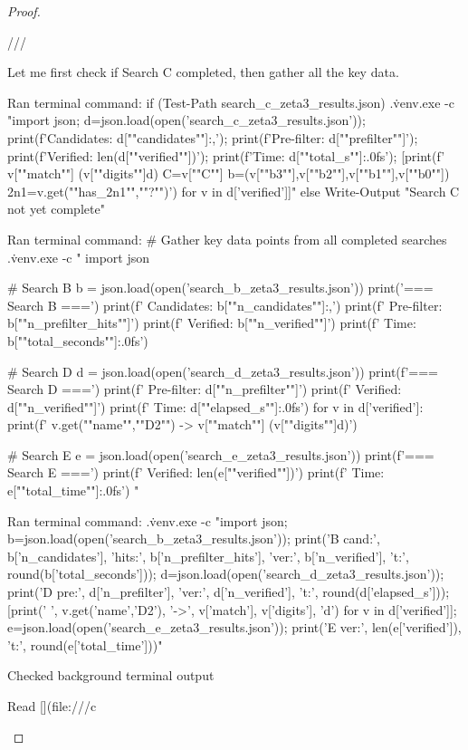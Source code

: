 \begin{theorem}
\begin{lemma}
\begin{proposition}
\begin{corollary}
\begin{proof}
\begin{remark}
///

Let me first check if Search C completed, then gather all the key data. 

Ran terminal command: if (Test-Path search_c_zeta3_results.json) { .\.venv\Scripts\python.exe -c "import json; d=json.load(open('search_c_zeta3_results.json')); print(f'Candidates: {d[""candidates""]:,}'); print(f'Pre-filter: {d[""prefilter""]}'); print(f'Verified: {len(d[""verified""])}'); print(f'Time: {d[""total_s""]:.0f}s'); [print(f'  {v[""match""]} ({v[""digits""]}d) C={v[""C""]} b=({v[""b3""]},{v[""b2""]},{v[""b1""]},{v[""b0""]}) 2n1={v.get(""has_2n1"",""?"")}') for v in d['verified']]" } else { Write-Output "Search C not yet complete" }

Ran terminal command: # Gather key data points from all completed searches
.\.venv\Scripts\python.exe -c "
import json

# Search B
b = json.load(open('search_b_zeta3_results.json'))
print('=== Search B ===')
print(f'  Candidates: {b[""n_candidates""]:,}')
print(f'  Pre-filter: {b[""n_prefilter_hits""]}')
print(f'  Verified: {b[""n_verified""]}')
print(f'  Time: {b[""total_seconds""]:.0f}s')

# Search D
d = json.load(open('search_d_zeta3_results.json'))
print(f'=== Search D ===')
print(f'  Pre-filter: {d[""n_prefilter""]}')
print(f'  Verified: {d[""n_verified""]}')
print(f'  Time: {d[""elapsed_s""]:.0f}s')
for v in d['verified']:
    print(f'    {v.get(""name"",""D2"")} -> {v[""match""]} ({v[""digits""]}d)')

# Search E
e = json.load(open('search_e_zeta3_results.json'))
print(f'=== Search E ===')
print(f'  Verified: {len(e[""verified""])}')
print(f'  Time: {e[""total_time""]:.0f}s')
"


Ran terminal command: .\.venv\Scripts\python.exe -c "import json; b=json.load(open('search_b_zeta3_results.json')); print('B cand:', b['n_candidates'], 'hits:', b['n_prefilter_hits'], 'ver:', b['n_verified'], 't:', round(b['total_seconds'])); d=json.load(open('search_d_zeta3_results.json')); print('D pre:', d['n_prefilter'], 'ver:', d['n_verified'], 't:', round(d['elapsed_s'])); [print('  ', v.get('name','D2'), '->', v['match'], v['digits'], 'd') for v in d['verified']]; e=json.load(open('search_e_zeta3_results.json')); print('E ver:', len(e['verified']), 't:', round(e['total_time']))"

Checked background terminal output

Read [](file:///c%


\end{remark}
\end{proof}
\end{corollary}
\end{proposition}
\end{lemma}
\end{theorem}
